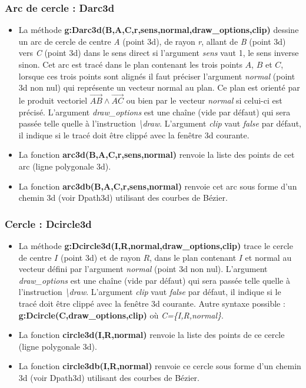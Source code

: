 \subsubsection{Arc de cercle : Darc3d}
 
\begin{itemize}
    \item La méthode \textbf{g:Darc3d(B,A,C,r,sens,normal,draw\_options,clip)} dessine un arc de cercle de centre \emph{A} (point 3d), de rayon \emph{r}, allant de \emph{B} (point 3d) vers \emph{C} (point 3d) dans le sens direct si l'argument \emph{sens} vaut 1, le sens inverse sinon. Cet arc est tracé dans le plan contenant les trois points $A$, $B$ et $C$, lorsque ces trois points sont alignés il faut préciser l'argument \emph{normal} (point 3d non nul) qui représente un vecteur normal au plan. Ce plan est orienté par le produit vectoriel $\vec{AB}\wedge\vec{AC}$ ou bien par le vecteur \emph{normal} si celui-ci est précisé. L'argument \emph{draw\_options} est une chaîne (vide par défaut) qui sera passée telle quelle à l'instruction \emph{\textbackslash draw}. L'argument \emph{clip} vaut \emph{false} par défaut, il indique si le tracé doit être clippé avec la fenêtre 3d courante.
    
    \item La fonction \textbf{arc3d(B,A,C,r,sens,normal)} renvoie la liste des points de cet arc (ligne polygonale 3d). 
    
    \item La fonction \textbf{arc3db(B,A,C,r,sens,normal)} renvoie cet arc sous forme d'un chemin 3d (voir Dpath3d) utilisant des courbes de Bézier.
\end{itemize}

\subsubsection{Cercle : Dcircle3d}

\begin{itemize}
    \item La méthode \textbf{g:Dcircle3d(I,R,normal,draw\_options,clip)} trace le cercle de centre $I$ (point 3d) et de rayon $R$, dans le plan contenant $I$ et normal au vecteur défini par l'argument \emph{normal} (point 3d non nul). L'argument \emph{draw\_options} est une chaîne (vide par défaut) qui sera passée telle quelle à l'instruction \emph{\textbackslash draw}. L'argument \emph{clip} vaut \emph{false} par défaut, il indique si le tracé doit être clippé avec la fenêtre 3d courante. Autre syntaxe possible :  \textbf{g:Dcircle(C,draw\_options,clip)} où \emph{C=\{I,R,normal\}}.
    
    \item La fonction \textbf{circle3d(I,R,normal)} renvoie la liste des points de ce cercle (ligne polygonale 3d). 
    
    \item La fonction \textbf{circle3db(I,R,normal)} renvoie ce cercle sous forme d'un chemin 3d (voir Dpath3d) utilisant des courbes de Bézier.
\end{itemize}
    
